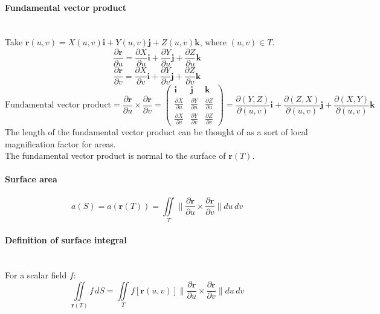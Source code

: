 \documentclass[10pt]{article}
\newcommand{\bs}[1]{\pmb{#1}}
\begin{document}
\paragraph{Fundamental vector product}\ \\
Take $\bs{r}(u,v) = X(u,v)\bs{i} + Y(u,v)\bs{j} + Z(u,v)\bs{k}$, where $(u,v) \in T$.
\begin{equation*} 
\frac{\partial \bs{r}}{\partial u} = \frac{\partial X}{\partial u}\bs{i} + \frac{\partial Y}{\partial u}\bs{j} + \frac{\partial Z}{\partial u}\bs{k}
\end{equation*}
\begin{equation*} 
\frac{\partial \bs{r}}{\partial v} = \frac{\partial X}{\partial v}\bs{i} + \frac{\partial Y}{\partial v}\bs{j} + \frac{\partial Z}{\partial v}\bs{k}
\end{equation*}
\begin{equation*}
\text{Fundamental vector product} = \frac{\partial \bs{r}}{\partial u} \times \frac{\partial \bs{r}}{\partial v}
= \begin{pmatrix}\bs{i} & \bs{j} & \bs{k} \\ \frac{\partial X}{\partial u} & \frac{\partial Y}{\partial u} & \frac{\partial Z}{\partial u} \\
\frac{\partial X}{\partial v} & \frac{\partial Y}{\partial v} & \frac{\partial Z}{\partial v} \end{pmatrix}
= \frac{\partial(Y,Z)}{\partial(u,v)}\bs{i} + \frac{\partial(Z,X)}{\partial(u,v)}\bs{j} + \frac{\partial(X,Y)}{\partial(u,v)}\bs{k}
\end{equation*}
The length of the fundamental vector product can be thought of as a sort of local magnification factor for areas.\\
The fundamental vector product is normal to the surface of $\bs{r}(T)$.

\paragraph{Surface area}
\begin{equation*}
a(S) = a(\bs{r}(T)) = \iint\limits_T \lVert \frac{\partial \bs{r}}{\partial u} \times \frac{\partial \bs{r}}{\partial v} \rVert du\, dv
\end{equation*}

\paragraph{Definition of surface integral}\ \\
For a scalar field $f$:
\begin{equation*}
\iint\limits_{\bs{r}(T)} f\, dS = \iint\limits_T f[\bs{r}(u, v)] \lVert \frac{\partial \bs{r}}{\partial u} \times \frac{\partial \bs{r}}{\partial v} \rVert du\, dv
\end{equation*}
\end{document}

